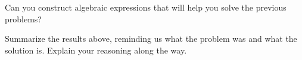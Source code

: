 \documentclass{ximera}
\begin{document}
\newpage 

\begin{problem}
Can you construct algebraic expressions that will help you solve the previous problems?  
\begin{freeResponse}
\end{freeResponse}
\vfill
\end{problem}

\begin{problem}
Summarize the results above, reminding us what the problem was and
what the solution is. Explain your reasoning along the way.
\begin{freeResponse}
\end{freeResponse}
\vfill
\end{problem}
\end{document}
